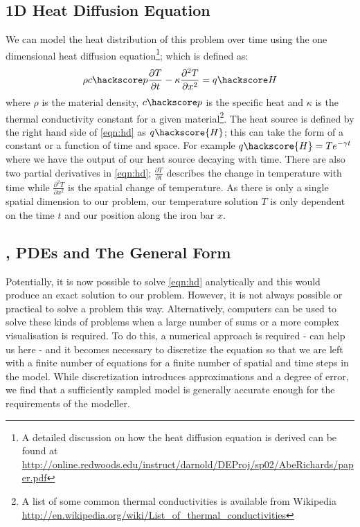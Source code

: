 \subsection{1D Heat Diffusion Equation}
We can model the heat distribution of this problem over time using the one dimensional heat diffusion equation\footnote{A detailed discussion on how the heat diffusion equation is derived can be found at \url{http://online.redwoods.edu/instruct/darnold/DEProj/sp02/AbeRichards/paper.pdf}};
which is defined as:
\begin{equation}
\rho c\hackscore p \frac{\partial T}{\partial t} - \kappa \frac{\partial^{2} T}{\partial x^{2}} = q\hackscore H 
\label{eqn:hd}
\end{equation}
where $\rho$ is the material density, $c\hackscore p$ is the specific heat and $\kappa$ is the thermal conductivity constant for a given material\footnote{A list of some common thermal conductivities is available from Wikipedia \url{http://en.wikipedia.org/wiki/List_of_thermal_conductivities}}. 
The heat source is defined by the right hand side of \ref{eqn:hd} as $q\hackscore{H}$; this can take the form of a constant or a function of time and space. For example $q\hackscore{H} = Te^{-\gamma t}$ where we have the output of our heat source decaying with time. There are also two partial derivatives in \ref{eqn:hd}; $\frac{\partial T}{\partial t}$ describes the change in temperature with time while $\frac{\partial ^2 T}{\partial x^2}$ is the spatial change of temperature. As there is only a single spatial dimension to our problem, our temperature solution $T$ is only dependent on the time $t$ and our position along the iron bar $x$.

\subsection{\esc, PDEs and The General Form}
Potentially, it is now possible to solve \ref{eqn:hd} analytically and this would produce an exact solution to our problem. However, it is not always possible or practical to solve a problem this way. Alternatively, computers can be used to solve these kinds of problems when a large number of sums or a more complex visualisation is required. To do this, a numerical approach is required - \esc can help us here -  and it becomes necessary to discretize the equation so that we are left with a finite number of equations for a finite number of spatial and time steps in the model. While discretization introduces approximations and a degree of error, we find that a sufficiently sampled model is generally accurate enough for the requirements of the modeller.

